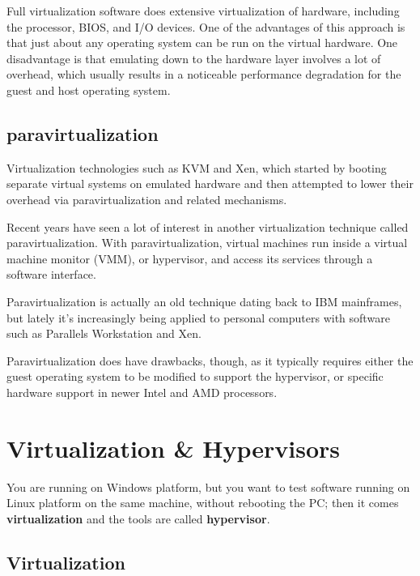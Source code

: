 Full virtualization software does extensive virtualization of hardware,
including the processor, BIOS, and I/O devices. One of the advantages of this
approach is that just about any operating system can be run on the virtual
hardware. One disadvantage is that emulating down to the hardware layer involves
a lot of overhead, which usually results in a noticeable performance degradation
for the guest and host operating system.

\subsection{paravirtualization}

Virtualization technologies such as KVM and Xen, which started by booting
separate virtual systems on emulated hardware and then attempted to lower their
overhead via paravirtualization and related mechanisms.


Recent years have seen a lot of interest in another virtualization technique
called paravirtualization. With paravirtualization, virtual machines run inside
a virtual machine monitor (VMM), or hypervisor, and access its services through
a software interface.

Paravirtualization is actually an old technique dating back to IBM mainframes,
but lately it's increasingly being applied to personal computers with software
such as Parallels Workstation and Xen.


Paravirtualization does have drawbacks, though, as it typically requires either
the guest operating system to be modified to support the hypervisor, or specific
hardware support in newer Intel and AMD processors.


\section{Virtualization \& Hypervisors}

You are running on Windows platform, but you want to test software running on
Linux platform on the same machine, without rebooting the PC; then it comes
{\bf virtualization} and the tools are called {\bf hypervisor}.

\subsection{Virtualization}


